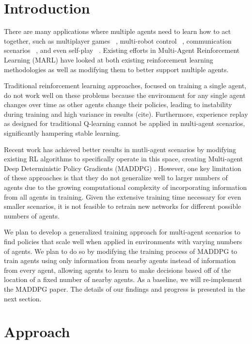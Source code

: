 \documentclass{article}
\begin{document}
\section{Introduction}
\label{submission}

There are many applications where multiple agents need to learn how to act together, such as multiplayer games ~\cite{multigames}, multi-robot control ~\cite{multirobot}, communication scenarios ~\cite{communication}, and even self-play ~\cite{selfplay}. Existing efforts in Multi-Agent Reinforcement Learning (MARL) have looked at both existing reinforcement learning methodologies as well as modifying them to better support multiple agents.

Traditional reinforcement learning approaches, focused on training a single agent, do not work well on these problems because the environment for any single agent changes over time as other agents change their policies, leading to instability during training and high variance in results (cite). Furthermore, experience replay as designed for traditional Q-learning cannot be applied in multi-agent scenarios, significantly hampering stable learning.

Recent work has achieved better results in mutli-agent scenarios by modifying existing RL algorithms to specifically operate in this space, creating Multi-agent Deep Deterministic Policy Gradients (MADDPG) \cite{maddpg}. However, one key limitation of these approaches is that they do not generalize well to larger numbers of agents due to the growing computational complexity of incorporating information from all agents in training. Given the extensive training time necessary for even smaller scenarios, it is not feasible to retrain new networks for different possible numbers of agents.

We plan to develop a generalized training approach for multi-agent scenarios to find policies that scale well when applied in environments with varying numbers of agents. We plan to do so by modifying the training process of MADDPG to train agents using only information from nearby agents instead of information from every agent, allowing agents to learn to make decisions based off of the location of a fixed number of nearby agents. As a baseline, we will re-implement the MADDPG \cite{maddpg} paper. The details of our findings and progress is presented in the next section. 

\section{Approach}
\end{document}
